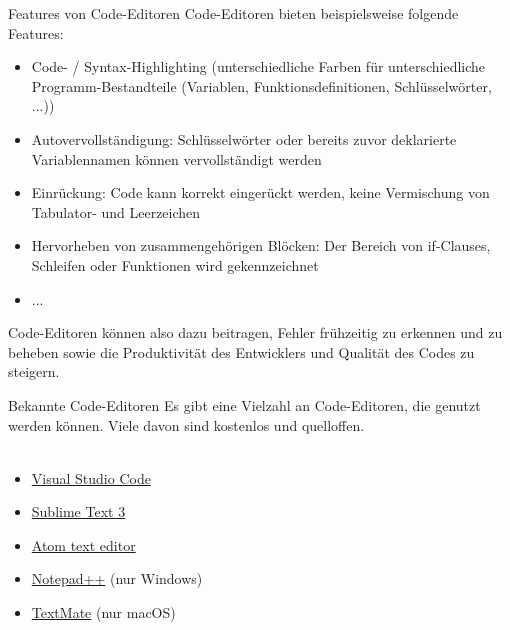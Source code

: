   \begin{frame}{Features von Code-Editoren}
      Code-Editoren bieten beispielsweise folgende Features:
      
      \begin{itemize}
          \item Code- / Syntax-Highlighting (unterschiedliche Farben für unterschiedliche Programm-Bestandteile (Variablen, Funktionsdefinitionen, Schlüsselwörter, ...))
          \item Autovervollständigung: Schlüsselwörter oder bereits zuvor deklarierte Variablennamen können vervollständigt werden
          \item Einrückung: Code kann korrekt eingerückt werden, keine Vermischung von Tabulator- und Leerzeichen
          \item Hervorheben von zusammengehörigen Blöcken: Der Bereich von if-Clauses, Schleifen oder Funktionen wird gekennzeichnet
          \item ...
      \end{itemize}
      
      Code-Editoren können also dazu beitragen, Fehler frühzeitig zu erkennen und zu beheben sowie die Produktivität des Entwicklers und Qualität des Codes zu steigern.
  \end{frame}
  
  \begin{frame}{Bekannte Code-Editoren}
      Es gibt eine Vielzahl an Code-Editoren, die genutzt werden können. Viele davon sind kostenlos und quelloffen.\\~\
      
\begin{itemize}
    \item \href{https://code.visualstudio.com/}{Visual Studio Code}
    \item \href{https://www.sublimetext.com/}{Sublime Text 3}
    \item \href{https://atom.io/}{Atom text editor}
    \item \href{https://notepad-plus-plus.org/}{Notepad++} (nur Windows)
    \item \href{https://macromates.com/}{TextMate} (nur macOS)
\end{itemize}
  \end{frame}
  
